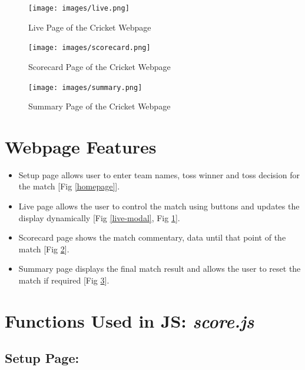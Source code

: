 \documentclass[a4paper,12pt]{article}
\begin{document}
\begin{figure}[h!]
\centering
\texttt{[image: images/live.png]}
\caption{Live Page of the Cricket Webpage}
\label{live}
\end{figure}

\vspace{1.5cm}

\begin{figure}[h!]
\centering
\texttt{[image: images/scorecard.png]}
\caption{Scorecard Page of the Cricket Webpage}
\label{scorecard}
\end{figure}

\begin{figure}[h!]
\centering
\texttt{[image: images/summary.png]}
\caption{Summary Page of the Cricket Webpage}
\label{summary}
\end{figure}  

\section{Webpage Features}
\begin{itemize}
  \item Setup page allows user to enter team names, toss winner and toss decision for the match [Fig \ref{homepage}].
  \item Live page allows the user to control the match using buttons and updates the display dynamically [Fig \ref{live-modal}, Fig \ref{live}].
  \item Scorecard page shows the match commentary, data until that point of the match [Fig \ref{scorecard}].
  \item Summary page displays the final match result and allows the user to reset the match if required [Fig \ref{summary}].
\end{itemize}

\section{Functions Used in JS: \textit{score.js}}

\subsection{Setup Page:}
\end{document}

